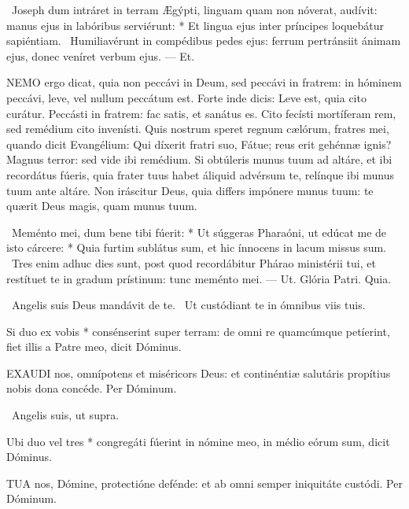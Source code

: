 \R\ Joseph dum intráret in terram Ægýpti, linguam quam non nóverat, audívit: manus ejus in labóribus serviérunt: * Et lingua ejus inter príncipes loquebátur sapiéntiam. \V\ Humiliavérunt in compédibus pedes ejus: ferrum pertránsiit ánimam ejus, donec veníret verbum ejus. --- Et.


\lettrine[lines=2]{N}{EMO} ergo dicat, quia non peccávi in Deum, sed peccávi in fratrem: in hóminem peccávi, leve, vel nullum peccátum est. Forte inde dicis: Leve est, quia cito curátur. Peccásti in fratrem: fac satis, et sanátus es. Cito fecísti mortíferam rem, sed remédium cito invenísti. Quis nostrum speret regnum cælórum, fratres mei, quando dicit Evangélium: Qui díxerit fratri suo, Fátue; reus erit gehénnæ ignis? Magnus terror: sed vide ibi remédium. Si obtúleris munus tuum ad altáre, et ibi recordátus fúeris, quia frater tuus habet áliquid advérsum te, relínque ibi munus tuum ante altáre. Non iráscitur Deus, quia differs impónere munus tuum: te quærit Deus magis, quam munus tuum.

\R\ Meménto mei, dum bene tibi fúerit: * Ut súggeras Pharaóni, ut edúcat me de isto cárcere: * Quia furtim sublátus sum, et hic ínnocens in lacum missus sum. \V\ Tres enim adhuc dies sunt, post quod recordábitur Phárao ministérii tui, et restítuet te in gradum prístinum: tunc meménto mei. --- Ut. Glória Patri. Quia.

\V\ Angelis suis Deus mandávit de te. \R\ Ut custódiant te in ómnibus viis tuis.

 Si duo ex vobis * consénserint super terram: de omni re quamcúmque petíerint, fiet illis a Patre meo, dicit Dóminus.


\lettrine[lines=2]{E}{XAUDI} nos, omnípotens et miséricors Deus: et continéntiæ salutáris propítius nobis dona concéde. Per Dóminum.

\V\ Angelis suis, ut supra.

 Ubi duo vel tres * congregáti fúerint in nómine meo, in médio eórum sum, dicit Dóminus.


\lettrine[lines=2]{T}{UA} nos, Dómine, protectióne defénde: et ab omni semper iniquitáte custódi. Per Dóminum.

\sectionornament



